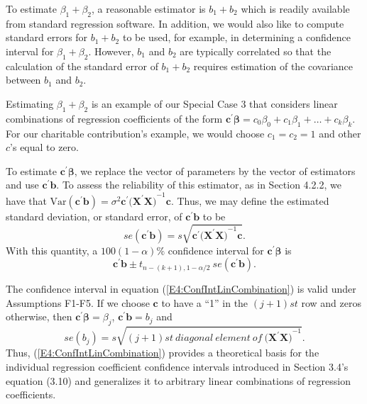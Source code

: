 To estimate $\beta_1+\beta_2$, a reasonable estimator is $b_1+b_2$
which is readily available from standard regression software. In
addition, we would also like to compute standard errors for
$b_1+b_2$ to be used, for example, in determining a confidence
interval for $\beta_1+\beta_2$. However, $b_1$ and $b_2$ are
typically correlated so that the calculation of the standard error
of $b_1+b_2$ requires estimation of the covariance between $b_1$ and
$b_2$.

Estimating $\beta_1 + \beta_2$ is an example of our Special Case 3
that considers linear combinations of regression coefficients of the
form $\mathbf{c}^{\prime}  \boldsymbol \beta=c_0\beta
_0+c_1\beta_1+\ldots+c_k\beta_k$. For our charitable contribution's
example, we would choose $c_1=c_2=1$ and other $c$'s equal to zero.

To estimate $\mathbf{c}^{\prime} \boldsymbol \beta $, we replace the
vector of
parameters by the vector of estimators and use $\mathbf{c}^{\prime}\mathbf{b%
}$. To assess the reliability of this estimator, as in Section
4.2.2, we have that $\mathrm{Var}\left(
\mathbf{c}^{\prime}\mathbf{b}\right) =\sigma^2
\mathbf{c}^{\prime}(\mathbf{X^{\prime}X)}^{-1}\mathbf{c}$. Thus, we
may define the estimated standard deviation, or standard error, of
$\mathbf{c} ^{\prime}\mathbf{b}$ to be
\begin{equation*}
se\left( \mathbf{c}^{\prime}\mathbf{b}\right) =s\sqrt{\mathbf{c}^{\prime}(%
\mathbf{X^{\prime}X)}^{-1}\mathbf{c}}.
\end{equation*}%
With this quantity, a $100(1-\alpha ) \%$ confidence interval for
$\mathbf{c}^{\prime} \boldsymbol \beta$ is
\begin{equation}  \label{E4:ConfIntLinCombination}
\mathbf{c}^{\prime}\mathbf{b}\pm t_{n-(k+1),1-\alpha /2} ~se(\mathbf{c}%
^{\prime}\mathbf{b}).
\end{equation}

The confidence interval in equation (\ref{E4:ConfIntLinCombination})
is valid under Assumptions F1-F5. If we choose $\mathbf{c}$ to have
a ``1'' in the $(j+1)st$ row and zeros otherwise, then
$\mathbf{c}^{\prime}\boldsymbol \beta =\beta _j$,
$\mathbf{c}^{\prime}\mathbf{b=}b_j$ and
\begin{equation*}
se(b_j)=s\sqrt{
(j+1)st~diagonal~element~of~(\mathbf{X^{\prime}X)}^{-1}}.
\end{equation*} Thus, (\ref{E4:ConfIntLinCombination}) provides a
theoretical basis for the individual regression coefficient
confidence intervals introduced in Section 3.4's equation (3.10) and
generalizes it to arbitrary linear combinations of regression
coefficients.

